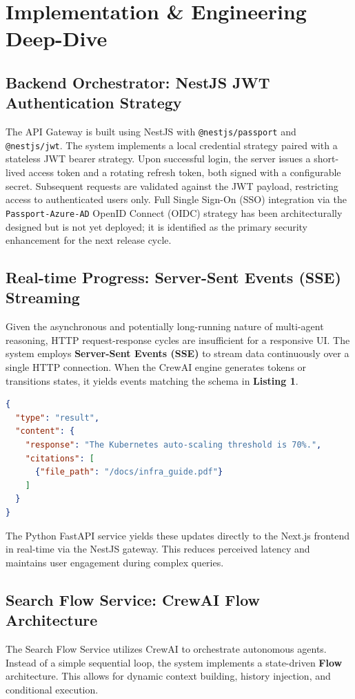 \documentclass[12pt]{article}
\begin{document}
\section{Implementation \& Engineering Deep-Dive}

\subsection{Backend Orchestrator: NestJS JWT Authentication Strategy}
The API Gateway is built using NestJS with \texttt{@nestjs/passport} and \texttt{@nestjs/jwt}. The system implements a local credential strategy paired with a stateless JWT bearer strategy. Upon successful login, the server issues a short-lived access token and a rotating refresh token, both signed with a configurable secret. Subsequent requests are validated against the JWT payload, restricting access to authenticated users only. Full Single Sign-On (SSO) integration via the \texttt{Passport-Azure-AD} OpenID Connect (OIDC) strategy has been architecturally designed but is not yet deployed; it is identified as the primary security enhancement for the next release cycle.

\subsection{Real-time Progress: Server-Sent Events (SSE) Streaming}
Given the asynchronous and potentially long-running nature of multi-agent reasoning, HTTP request-response cycles are insufficient for a responsive UI. The system employs \textbf{Server-Sent Events (SSE)} to stream data continuously over a single HTTP connection. When the CrewAI engine generates tokens or transitions states, it yields events matching the schema in \textbf{Listing 1}.

\begin{lstlisting}[language=json, caption=SSE Progress Stream Schema]
{
  "type": "result",
  "content": {
    "response": "The Kubernetes auto-scaling threshold is 70%.",
    "citations": [
      {"file_path": "/docs/infra_guide.pdf"}
    ]
  }
}
\end{lstlisting}

The Python FastAPI service yields these updates directly to the Next.js frontend in real-time via the NestJS gateway. This reduces perceived latency and maintains user engagement during complex queries.

\subsection{Search Flow Service: CrewAI Flow Architecture}
The Search Flow Service utilizes CrewAI to orchestrate autonomous agents. Instead of a simple sequential loop, the system implements a state-driven \textbf{Flow} architecture. This allows for dynamic context building, history injection, and conditional execution.
\end{document}
